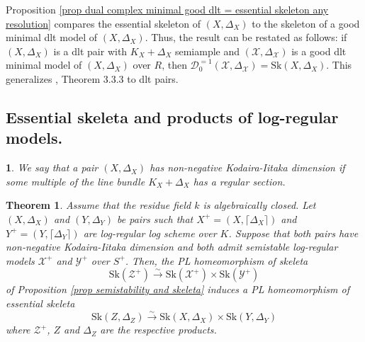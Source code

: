 \documentclass{amsart}%
\numberwithin{equation}{subsection}
\theoremstyle{plain2}
\newtheorem{theorem}[equation]{Theorem}
\theoremstyle{definition2}
\theoremstyle{stepstyle}
\theoremstyle{point}
\theoremstyle{subpoint}
\newtheorem{subpoint}[equation]{}%
\newcommand{\spa}[1]{\begin{subpoint}#1\end{subpoint}}           %
\newcommand{\cX}{\ensuremath{\mathscr{X}}}
\newcommand{\cY}{\ensuremath{\mathscr{Y}}}
\newcommand{\cZ}{\ensuremath{\mathscr{Z}}}
\renewcommand{\cY}{\ensuremath{\mathscr{Y}}}
\newcommand{\Sk}{\mathrm{Sk}}
\begin{document}
Proposition \ref{prop dual complex minimal good dlt = essential skeleton any resolution} compares the essential skeleton of $(X,\Delta_X)$ to the skeleton of a good minimal dlt model of $(X,\Delta_X)$. Thus, the result can be restated as follows: if $(X,\Delta_X)$ is a dlt pair with $K_X+\Delta_X$ semiample and $(\cX,\Delta_\cX)$ is a good dlt minimal model of $(X,\Delta_X)$ over $R$, then $\mathcal{D}_0^{=1}(\cX, \Delta_\cX) = \Sk(X,\Delta_X)$. This generalizes \cite{NicaiseXu}, Theorem 3.3.3 to dlt pairs.

\subsection{Essential skeleta and products of log-regular models.}

\spa{We say that a pair $(X,\Delta_X)$ has non-negative Kodaira-Iitaka dimension if some multiple of the line bundle $K_X + \Delta_X$ has a regular section.}
\begin{theorem} \label{thm essential skeleton of product via log-reg}
Assume that the residue field $k$ is algebraically closed. Let $(X,\Delta_X)$ and $(Y,\Delta_Y)$ be pairs such that $X^+=(X,\lceil \Delta_X \rceil)$ and $Y^+=(Y, \lceil \Delta_Y\rceil)$ are log-regular log scheme over $K$. Suppose that both pairs have non-negative Kodaira-Iitaka dimension and both admit semistable log-regular models $\cX^+$ and $\cY^+$ over $S^+$. Then, the PL homeomorphism of skeleta $$\Sk(\cZ^+) \xrightarrow{\sim} \Sk(\cX^+) \times \Sk(\cY^+)$$of Proposition \ref{prop semistability and skeleta} induces a PL homeomorphism of essential skeleta $$\Sk(Z,\Delta_Z) \xrightarrow{\sim} \Sk(X,\Delta_X) \times \Sk(Y,\Delta_Y)$$ where $\cZ^+$, $Z$ and $\Delta_Z$ are the respective products. 
\end{theorem}
\end{document}
